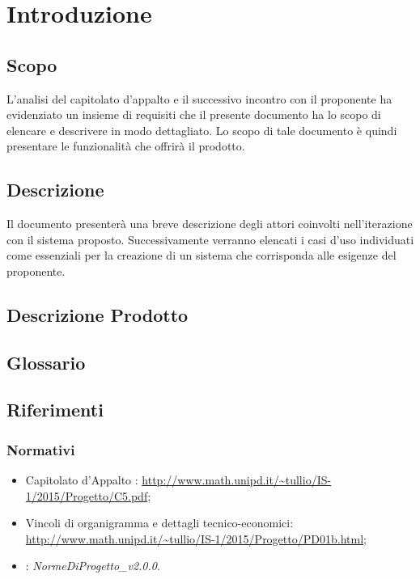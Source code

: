 \documentclass[12pt,a4paper]{article}
\begin{document}
\newpage
\tableofcontents
\newpage
\listoftables
\listoffigures
\newpage

\section{Introduzione}

\subsection{Scopo}
L’analisi del capitolato d’appalto e il successivo incontro con il proponente ha evidenziato un insieme di requisiti che il presente documento ha lo scopo di elencare e descrivere in modo dettagliato. Lo scopo di tale documento è quindi presentare le funzionalità che offrirà il prodotto.

\subsection{Descrizione}
Il documento presenterà una breve descrizione degli attori coinvolti nell'iterazione con il sistema proposto. Successivamente verranno elencati i casi d'uso individuati come essenziali per la creazione di un sistema che corrisponda alle esigenze del proponente.

\subsection{Descrizione Prodotto}
\descrizioneProdotto

\subsection{Glossario}\label{glossario}
\glossarioPrint

\subsection{Riferimenti}\label{riferimenti}
\subsubsection{Normativi}
\begin{itemize}
	\item Capitolato d’Appalto \prjL: \url{http://www.math.unipd.it/~tullio/IS-1/2015/Progetto/C5.pdf};
	\item Vincoli di organigramma e dettagli tecnico-economici: \url{http://www.math.unipd.it/~tullio/IS-1/2015/Progetto/PD01b.html};
	\item \NdP: \textit{NormeDiProgetto\_v2.0.0}. 
\end{itemize}
\newpage
\end{document}
